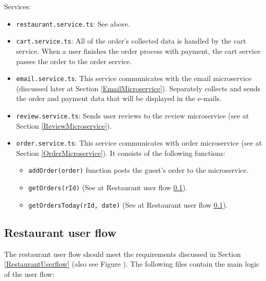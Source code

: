Services:
\begin{itemize}
	\item \verb+restaurant.service.ts+: See above.
	\item \verb+cart.service.ts+: All of the order's collected data is handled by the cart service. When a user finishes the order process with payment, the cart service passes the order to the order service.
	\item \verb+email.service.ts+: This service communicates with the email microservice (discussed later at Section \ref{EmailMicroservice}). Separately collects and sends the order and payment data that will be displayed in the e-mails.
	\item \verb+review.service.ts+: Sends user reviews to the review microservice (see at Section \ref{ReviewMicroservice}).
	\item \verb+order.service.ts+: This service communicates with order microservice (see at Section \ref{OrderMicroservice}). It consists of the following functions:
	\begin{itemize}
		\item\verb+addOrder(order)+ function posts the guest's order to the microservice.
		\item\verb+getOrders(rId)+ (See at Restaurant user flow \ref{RestaurantSPA}).
		\item\verb+getOrdersToday(rId, date)+ (See at Restaurant user flow  \ref{RestaurantSPA}).
	\end{itemize}
\end{itemize}

\subsection{Restaurant user flow}\label{RestaurantSPA}
 
 The restaurant user flow should meet the requirements discussed in Section \ref{RestaurantUserflow} (also see Figure ). The following files contain the main logic of the user flow:
 
